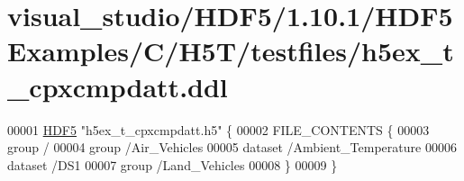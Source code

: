 \hypertarget{visual__studio_2_h_d_f5_21_810_81_2_h_d_f5_examples_2_c_2_h5_t_2testfiles_2h5ex__t__cpxcmpdatt_8ddl_source}{}\section{visual\+\_\+studio/\+H\+D\+F5/1.10.1/\+H\+D\+F5\+Examples/\+C/\+H5\+T/testfiles/h5ex\+\_\+t\+\_\+cpxcmpdatt.ddl}
\label{visual__studio_2_h_d_f5_21_810_81_2_h_d_f5_examples_2_c_2_h5_t_2testfiles_2h5ex__t__cpxcmpdatt_8ddl_source}

\begin{DoxyCode}
00001 \hyperlink{namespace_h_d_f5}{HDF5} \textcolor{stringliteral}{"h5ex\_t\_cpxcmpdatt.h5"} \{
00002 FILE\_CONTENTS \{
00003  group      /
00004  group      /Air\_Vehicles
00005  dataset    /Ambient\_Temperature
00006  dataset    /DS1
00007  group      /Land\_Vehicles
00008  \}
00009 \}
\end{DoxyCode}
